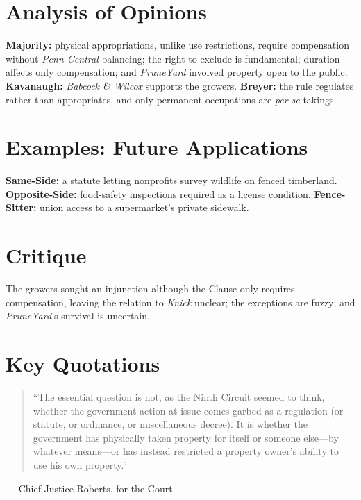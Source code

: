 \documentclass[12pt]{article}
\begin{document}
\section{Analysis of Opinions}
\textbf{Majority:} physical appropriations, unlike use restrictions, require compensation without \textit{Penn Central} balancing; the right to exclude is fundamental; duration affects only compensation; and \textit{PruneYard} involved property open to the public. \textbf{Kavanaugh:} \textit{Babcock \& Wilcox} supports the growers. \textbf{Breyer:} the rule regulates rather than appropriates, and only permanent occupations are \emph{per se} takings.

\section{Examples: Future Applications}
\textbf{Same-Side:} a statute letting nonprofits survey wildlife on fenced timberland. \textbf{Opposite-Side:} food-safety inspections required as a license condition. \textbf{Fence-Sitter:} union access to a supermarket's private sidewalk.

\section{Critique}
The growers sought an injunction although the Clause only requires compensation, leaving the relation to \textit{Knick} unclear; the exceptions are fuzzy; and \textit{PruneYard}'s survival is uncertain.

\section{Key Quotations}
\begin{quote}
``The essential question is not, as the Ninth Circuit seemed to think, whether the government action at issue comes garbed as a regulation (or statute, or ordinance, or miscellaneous decree). It is whether the government has physically taken property for itself or someone else---by whatever means---or has instead restricted a property owner's ability to use his own property.''
\end{quote}
\noindent --- Chief Justice Roberts, for the Court.
\end{document}
